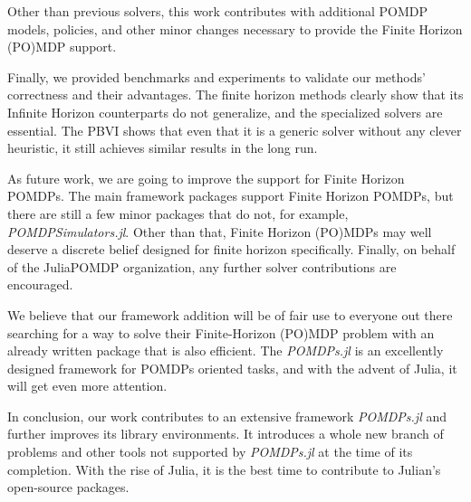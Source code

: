 Other than previous solvers, this work contributes with additional POMDP models, policies, and other minor changes necessary to provide the Finite Horizon (PO)MDP support.

Finally, we provided benchmarks and experiments to validate our methods' correctness and their advantages. The finite horizon methods clearly show that its Infinite Horizon counterparts do not generalize, and the specialized solvers are essential. The PBVI shows that even that it is a generic solver without any clever heuristic, it still achieves similar results in the long run.

As future work, we are going to improve the support for Finite Horizon POMDPs. The main framework packages support Finite Horizon POMDPs, but there are still a few minor packages that do not, for example, \textit{POMDPSimulators.jl}. Other than that, Finite Horizon (PO)MDPs may well deserve a discrete belief designed for finite horizon specifically. Finally, on behalf of the JuliaPOMDP organization, any further solver contributions are encouraged. 


We believe that our framework addition will be of fair use to everyone out there searching for a way to solve their Finite-Horizon (PO)MDP problem with an already written package that is also efficient. The \textit{POMDPs.jl} is an excellently designed framework for POMDPs oriented tasks, and with the advent of Julia, it will get even more attention.


In conclusion, our work contributes to an extensive framework \textit{POMDPs.jl} and further improves its library environments. It introduces a whole new branch of problems and other tools not supported by \textit{POMDPs.jl} at the time of its completion. With the rise of Julia, it is the best time to contribute to Julian's open-source packages.


